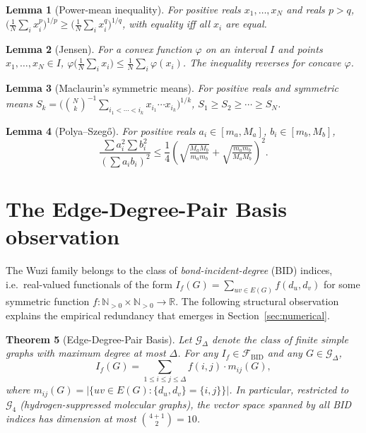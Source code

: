 \documentclass[11pt,a4paper]{article}
\newtheorem{theorem}{Theorem}[section]
\newtheorem{lemma}[theorem]{Lemma}
\theoremstyle{definition}
\newcommand{\bid}{\mathcal{F}_{\mathrm{BID}}}
\begin{document}
\begin{lemma}[Power-mean inequality]\label{lem:pm}
For positive reals $x_1,\ldots,x_N$ and reals $p>q$,
\(\bigl(\frac{1}{N}\sum_i x_i^p\bigr)^{1/p}\ge
\bigl(\frac{1}{N}\sum_i x_i^q\bigr)^{1/q}\),
with equality iff all $x_i$ are equal.
\end{lemma}

\begin{lemma}[Jensen]\label{lem:jensen}
For a convex function $\varphi$ on an interval $I$ and points
$x_1,\ldots,x_N\in I$,
\(\varphi\!\bigl(\frac{1}{N}\sum_i x_i\bigr)\le \frac{1}{N}\sum_i\varphi(x_i)\).
The inequality reverses for concave $\varphi$.
\end{lemma}

\begin{lemma}[Maclaurin's symmetric means]\label{lem:maclaurin}
For positive reals and symmetric means
$S_k=\bigl(\binom{N}{k}^{-1}\sum_{i_1<\cdots<i_k}x_{i_1}\cdots x_{i_k}\bigr)^{1/k}$,
$S_1\ge S_2\ge\cdots\ge S_N$.
\end{lemma}

\begin{lemma}[Polya--Szeg\H{o}]\label{lem:ps}
For positive reals $a_i\in[m_a,M_a]$, $b_i\in[m_b,M_b]$,
\[
\frac{\sum a_i^2 \sum b_i^2}{(\sum a_i b_i)^2}
\le \frac{1}{4}\left(\sqrt{\tfrac{M_a M_b}{m_a m_b}}+\sqrt{\tfrac{m_a m_b}{M_a M_b}}\right)^{\!2}.
\]
\end{lemma}

\section{The Edge-Degree-Pair Basis observation}\label{sec:bid}

The Wuzi family belongs to the class of \emph{bond-incident-degree}
(BID) indices, i.e.\ real-valued functionals of the form
$I_f(G)=\sum_{uv\in E(G)} f(d_u,d_v)$ for some symmetric function
$f:\mathbb{N}_{>0}\times\mathbb{N}_{>0}\to\mathbb{R}$. The
following structural observation explains the empirical
redundancy that emerges in Section~\ref{sec:numerical}.

\begin{theorem}[Edge-Degree-Pair Basis]\label{thm:bid}
Let $\mathcal{G}_\Delta$ denote the class of finite simple graphs
with maximum degree at most $\Delta$. For any
$I_f\in\bid$ and any $G\in\mathcal{G}_\Delta$,
\begin{equation}\label{eq:bid_linear}
I_f(G) = \sum_{1\le i\le j\le \Delta} f(i,j)\cdot m_{ij}(G),
\end{equation}
where $m_{ij}(G)=\bigl|\{uv\in E(G):\{d_u,d_v\}=\{i,j\}\}\bigr|$.
In particular, restricted to $\mathcal{G}_4$ (hydrogen-suppressed
molecular graphs), the vector space spanned by all BID indices has
dimension at most $\binom{4+1}{2}=10$.
\end{theorem}
\end{document}
